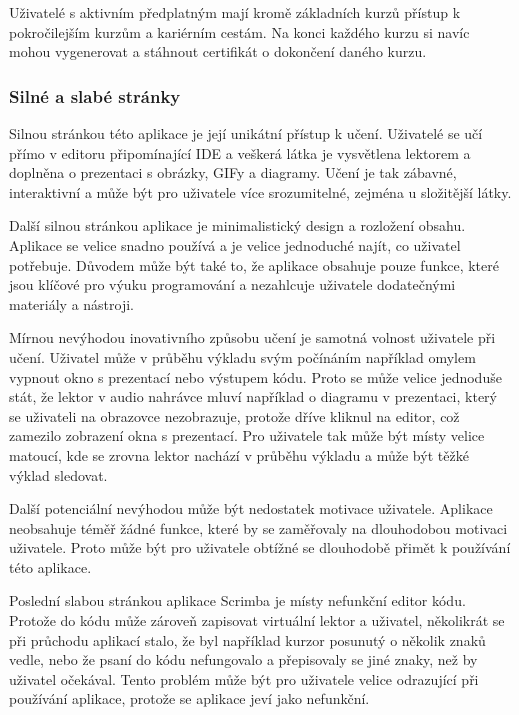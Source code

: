 Uživatelé s aktivním předplatným mají kromě základních kurzů přístup k pokročilejším kurzům a kariérním cestám. Na konci každého kurzu si navíc mohou vygenerovat a stáhnout certifikát o dokončení daného kurzu.

\subsubsection{Silné a slabé stránky}

Silnou stránkou této aplikace je její unikátní přístup k učení. Uživatelé se učí přímo v editoru připomínající IDE a veškerá látka je vysvětlena lektorem a doplněna o prezentaci s obrázky, GIFy a diagramy. Učení je tak zábavné, interaktivní a může být pro uživatele více srozumitelné, zejména u složitější látky.

Další silnou stránkou aplikace je minimalistický design a rozložení obsahu. Aplikace se velice snadno používá a je velice jednoduché najít, co uživatel potřebuje. Důvodem může být také to, že aplikace obsahuje pouze funkce, které jsou klíčové pro výuku programování a nezahlcuje uživatele dodatečnými materiály a nástroji.

Mírnou nevýhodou inovativního způsobu učení je samotná volnost uživatele při učení. Uživatel může v průběhu výkladu svým počínáním například omylem vypnout okno s prezentací nebo výstupem kódu. Proto se může velice jednoduše stát, že lektor v audio nahrávce mluví například o diagramu v prezentaci, který se uživateli na obrazovce nezobrazuje, protože dříve kliknul na editor, což zamezilo zobrazení okna s prezentací. Pro uživatele tak může být místy velice matoucí, kde se zrovna lektor nachází v průběhu výkladu a může být těžké výklad sledovat.

Další potenciální nevýhodou může být nedostatek motivace uživatele. Aplikace neobsahuje téměř žádné funkce, které by se zaměřovaly na dlouhodobou motivaci uživatele. Proto může být pro uživatele obtížné se dlouhodobě přimět k používání této aplikace.

Poslední slabou stránkou aplikace Scrimba je místy nefunkční editor kódu. Protože do kódu může zároveň zapisovat virtuální lektor a uživatel, několikrát se při průchodu aplikací stalo, že byl například kurzor posunutý o několik znaků vedle, nebo že psaní do kódu nefungovalo a přepisovaly se jiné znaky, než by uživatel očekával. Tento problém může být pro uživatele velice odrazující při používání aplikace, protože se aplikace jeví jako nefunkční.

